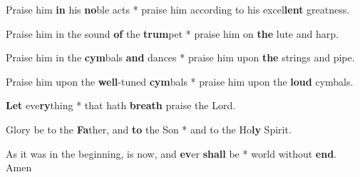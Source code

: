 \begin{multicols}{2}
	Praise him \textbf{in} his \textbf{no}ble acts * praise him according to his excel\textbf{lent} greatness.
	
	Praise him in the sound \textbf{of} the \textbf{trum}pet * praise him on \textbf{the} lute and harp.
	
	Praise him in the \textbf{cym}bals \textbf{and} dances * praise him upon \textbf{the} strings and pipe.
	
	Praise him upon the \textbf{well}-tuned \textbf{cym}bals * praise him upon the \textbf{loud} cymbals.
	
	\textbf{Let} eve\textbf{ry}thing * that hath \textbf{breath} praise the Lord.
	
	Glory be to the \textbf{Fa}ther, and \textbf{to} the Son * and to the Ho\textbf{ly} Spirit.
	
	As it was in the beginning, is now, and \textbf{ev}er \textbf{shall} be * world without \textbf{end}. Amen
\end{multicols}
